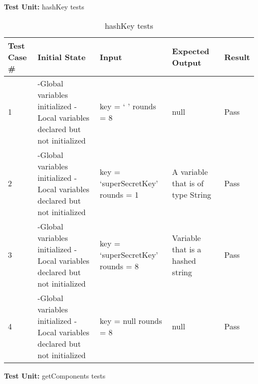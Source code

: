 \documentclass[12pt]{article}
\begin{document}
  \break

  \textbf{Test Unit:} hashKey tests \newline
  \begin{table}[H]
  \centering
        \caption{hashKey tests}
          \label{tab:table2}
        \begin{tabular}{ | p{1cm} | p{5cm} | p{4cm} | p{3cm} | p{1.2cm} | }
          \hline
              \textbf{Test Case \#} & \textbf{Initial State} & \textbf{Input} & \textbf{Expected Output} & \textbf{Result} \\
          \hline
            1 & -Global variables initialized \newline -Local variables declared but not initialized & key = `  ' \newline rounds = 8 & null & Pass \\
          \hline
            2 & -Global variables initialized \newline -Local variables declared but not initialized & key = `superSecretKey' \newline rounds = 1 & A variable that is of type String & Pass \\
          \hline
            3 & -Global variables initialized \newline -Local variables declared but not initialized & key = `superSecretKey' \newline rounds = 8 & Variable that is a hashed string & Pass \\
          \hline
            4 & -Global variables initialized \newline -Local variables declared but not initialized & key = null \newline rounds = 8 & null & Pass \\
         \hline
        \end{tabular}
    \end{table}

\break
  \textbf{Test Unit:} getComponents tests \newline
\end{document}
